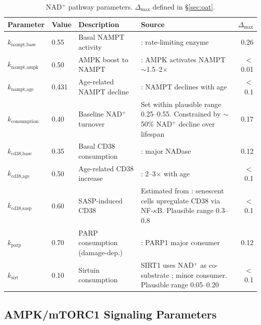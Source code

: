 \documentclass[11pt]{article}
\begin{document}
\begin{table}[H]
\centering
\caption{NAD$^+$ pathway parameters. $\Delta_{\max}$ defined in \S\ref{sec:oat}.}
\begin{tabular}{|ll|p{3cm}|p{6cm}|r|}
\hline
Parameter & Value & Description & Source & $\Delta_{\max}$ \\
\hline
$k_{\text{nampt,base}}$ & 0.55 & Basal NAMPT activity & \citet{Yoshino2011}: rate-limiting enzyme & 0.26 \\
\hline
$k_{\text{nampt,ampk}}$ & 0.50 & AMPK boost to NAMPT & \citet{Canto2009}: AMPK activates NAMPT $\sim$1.5--2$\times$ & $<$0.01 \\
\hline
$k_{\text{nampt,age}}$ & 0.431 & Age-related NAMPT decline & \citet{Yoshino2011}: NAMPT declines with age & $<$0.1 \\
\hline
$k_{\text{consumption}}$ & 0.40 & Baseline NAD$^+$ turnover & Set within plausible range 0.25--0.55. Constrained by $\sim$50\% NAD$^+$ decline over lifespan \citep{Massudi2012} & 0.17 \\
\hline
$k_{\text{cd38,base}}$ & 0.35 & Basal CD38 consumption & \citet{Chini2020}: major NADase & 0.12 \\
\hline
$k_{\text{cd38,age}}$ & 0.50 & Age-related CD38 increase & \citet{CamachoPereira2016}: 2--3$\times$ with age & $<$0.1 \\
\hline
$k_{\text{cd38,sasp}}$ & 0.60 & SASP-induced CD38 & Estimated from \citet{Covarrubias2020}: senescent cells upregulate CD38 via NF-$\kappa$B. Plausible range 0.3--0.8 & $<$0.1 \\
\hline
$k_{\text{parp}}$ & 0.70 & PARP consumption (damage-dep.) & \citet{Massudi2012}: PARP1 major consumer & 0.12 \\
\hline
$k_{\text{sirt}}$ & 0.10 & Sirtuin consumption & SIRT1 uses NAD$^+$ as co-substrate \citep{Imai2000}; minor consumer. Plausible range 0.05--0.20 & $<$0.1 \\
\hline
\end{tabular}
\end{table}

\subsection{AMPK/mTORC1 Signaling Parameters}
\end{document}
